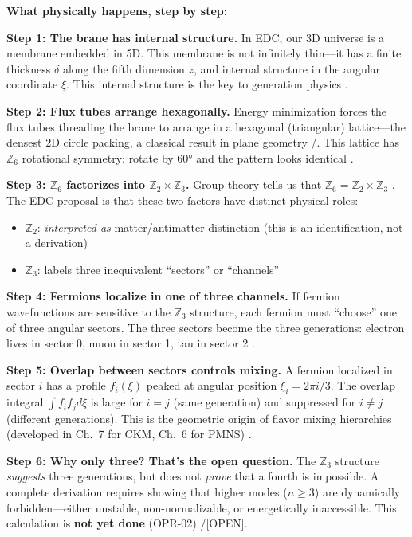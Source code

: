 \begin{tcolorbox}[colback=green!5!white, colframe=green!50!black,
    title=\textbf{Physical Process Narrative: Why Three Generations Appear in 5D EDC}]
\textbf{What physically happens, step by step:}

\textbf{Step 1: The brane has internal structure.}
In EDC, our 3D universe is a membrane embedded in 5D. This membrane is not
infinitely thin---it has a finite thickness $\delta$ along the fifth dimension $z$,
and internal structure in the angular coordinate $\xi$. This internal structure
is the key to generation physics \tagP{}.

\textbf{Step 2: Flux tubes arrange hexagonally.}
Energy minimization forces the flux tubes threading
the brane to arrange in a hexagonal (triangular) lattice---the densest 2D
circle packing, a classical result in plane geometry \tagDc{}/\tagP{}. This lattice has $\mathbb{Z}_6$
rotational symmetry: rotate by $60°$ and the pattern looks identical \tagDc{}.

\textbf{Step 3: $\mathbb{Z}_6$ factorizes into $\mathbb{Z}_2 \times \mathbb{Z}_3$.}
Group theory tells us that $\mathbb{Z}_6 = \mathbb{Z}_2 \times \mathbb{Z}_3$ \tagM{}.
The EDC proposal is that these two factors have distinct physical roles:
\begin{itemize}[nosep]
    \item $\mathbb{Z}_2$: \emph{interpreted as} matter/antimatter distinction \tagP{}
          (this is an identification, not a derivation)
    \item $\mathbb{Z}_3$: labels three inequivalent ``sectors'' or ``channels'' \tagP{}
\end{itemize}

\textbf{Step 4: Fermions localize in one of three channels.}
If fermion wavefunctions are sensitive to the $\mathbb{Z}_3$ structure, each
fermion must ``choose'' one of three angular sectors. The three sectors become
the three generations: electron lives in sector 0, muon in sector 1, tau in
sector 2 \tagP{}.

\textbf{Step 5: Overlap between sectors controls mixing.}
A fermion localized in sector $i$ has a profile $f_i(\xi)$ peaked at angular
position $\xi_i = 2\pi i/3$. The overlap integral $\int f_i f_j d\xi$ is large
for $i = j$ (same generation) and suppressed for $i \neq j$ (different
generations). This is the geometric origin of flavor mixing hierarchies
(developed in Ch.~7 for CKM, Ch.~6 for PMNS) \tagI{}.

\textbf{Step 6: Why only three? That's the open question.}
The $\mathbb{Z}_3$ structure \emph{suggests} three generations, but does not
\emph{prove} that a fourth is impossible. A complete derivation requires showing
that higher modes ($n \geq 3$) are dynamically forbidden---either unstable,
non-normalizable, or energetically inaccessible. This calculation is \textbf{not
yet done} (OPR-02) \tagP{}/[OPEN].
\end{tcolorbox}

